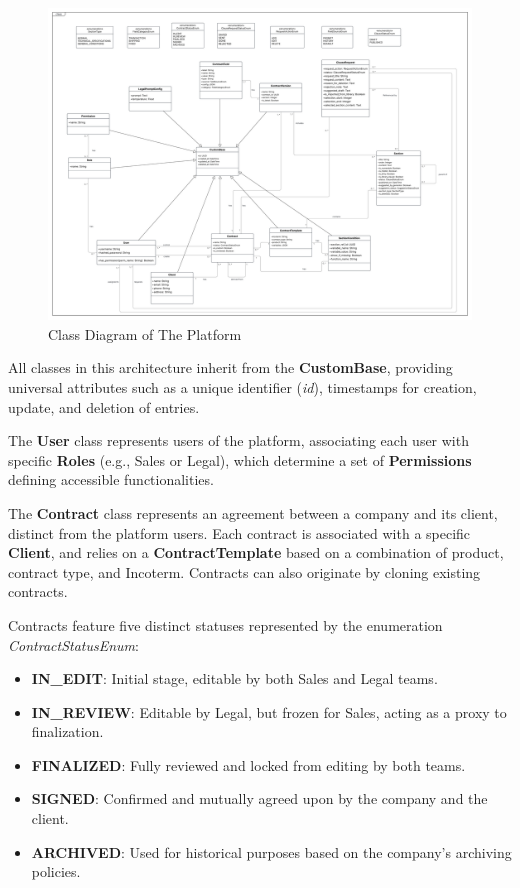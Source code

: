 \begin{landscape}
\begin{figure}[H]
    \centering
    \includegraphics[width=1.2\textwidth]{Images/Class Diagram.png}
    \caption{Class Diagram of The Platform}
    \label{fig:class_diagram}
\end{figure}
\end{landscape}

All classes in this architecture inherit from the \textbf{CustomBase}, providing universal attributes such as a unique identifier (\textit{id}), timestamps for creation, update, and deletion of entries.\mynewline

The \textbf{User} class represents users of the platform, associating each user with specific \textbf{Roles} (e.g., Sales or Legal), which determine a set of \textbf{Permissions} defining accessible functionalities.\mynewline

The \textbf{Contract} class represents an agreement between a company and its client, distinct from the platform users. Each contract is associated with a specific \textbf{Client}, and relies on a \textbf{ContractTemplate} based on a combination of product, contract type, and Incoterm. Contracts can also originate by cloning existing contracts.\mynewline

Contracts feature five distinct statuses represented by the enumeration \textit{ContractStatusEnum}:

\begin{itemize}
    \item \textbf{IN\_EDIT}: Initial stage, editable by both Sales and Legal teams.
    \item \textbf{IN\_REVIEW}: Editable by Legal, but frozen for Sales, acting as a proxy to finalization.
    \item \textbf{FINALIZED}: Fully reviewed and locked from editing by both teams.
    \item \textbf{SIGNED}: Confirmed and mutually agreed upon by the company and the client.
    \item \textbf{ARCHIVED}: Used for historical purposes based on the company's archiving policies.
\end{itemize}

